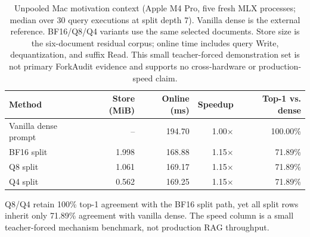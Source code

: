\begin{table}[t]
\caption{Unpooled Mac motivation context (Apple M4 Pro, five fresh MLX processes; median over 30 query executions at split depth 7). Vanilla dense is the external reference. \qcomem{} BF16/Q8/Q4 variants use the same selected documents. Store size is the six-document residual corpus; online time includes query Write, dequantization, and suffix Read. This small teacher-forced demonstration set is not primary ForkAudit evidence and supports no cross-hardware or production-speed claim.}
\label{tab:mac-motivation}
\centering\scriptsize
\setlength{\tabcolsep}{2.7pt}
\begin{tabular}{@{}lrrrr@{}}
\toprule
Method & Store (MiB) & Online (ms) & Speedup & Top-1 vs. dense \\
\midrule
Vanilla dense prompt & -- & 194.70 & 1.00$\times$ & 100.00\% \\
\qcomem{} BF16 split & 1.998 & 168.88 & 1.15$\times$ & 71.89\% \\
\qcomem{} Q8 split & 1.061 & 169.17 & 1.15$\times$ & 71.89\% \\
\qcomem{} Q4 split & 0.562 & 169.25 & 1.15$\times$ & 71.89\% \\
\bottomrule
\end{tabular}
\vspace{0.5mm}
\parbox{0.98\linewidth}{\scriptsize Q8/Q4 retain 100\% top-1 agreement with the BF16 split path, yet all split rows inherit only 71.89\% agreement with vanilla dense. The speed column is a small teacher-forced mechanism benchmark, not production RAG throughput.}
\end{table}
